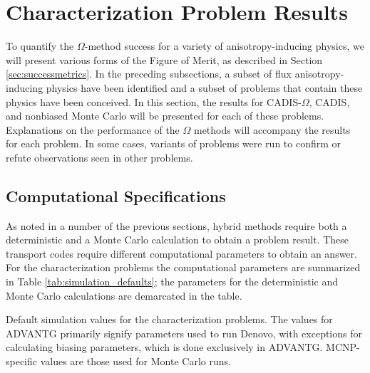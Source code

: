 \section{Characterization Problem Results}
\label{sec:CharResults}

To quantify the $\Omega$-method success for a variety of anisotropy-inducing
physics, we will present various forms of the Figure of Merit, as described in
Section \ref{sec:successmetrics}.
In the preceding subsections, a
subset of flux anisotropy-inducing physics have been identified
and a subset of problems that contain these physics have been conceived.
In this section, the results for CADIS-$\Omega$, CADIS, and nonbiased Monte Carlo
will be presented for each of these problems. Explanations on the performance of
the $\Omega$ methods will accompany the results for each problem. In some cases,
variants of problems were run to confirm or refute observations seen
in other problems.

\subsection{Computational Specifications}
\label{subsec:comp_specs}

As noted in a number of the previous sections, hybrid methods require both a
deterministic and a Monte Carlo calculation to obtain a problem result. These
transport codes require different computational parameters to obtain an answer.
For the characterization problems the computational parameters are summarized in
Table \ref{tab:simulation_defaults}; the parameters for the deterministic and
Monte Carlo calculations are demarcated in the table.

\begin{table}[h!]
  \centering
  
  \caption[Default simulation values for characterization problems.]{
    Default simulation values for the characterization problems. The values for
    ADVANTG primarily signify parameters used to run Denovo, with exceptions for
    calculating biasing parameters, which is done exclusively in ADVANTG.
    MCNP-specific values are those used for Monte Carlo runs.
  }
  \label{tab:simulation_defaults}
\end{table}

